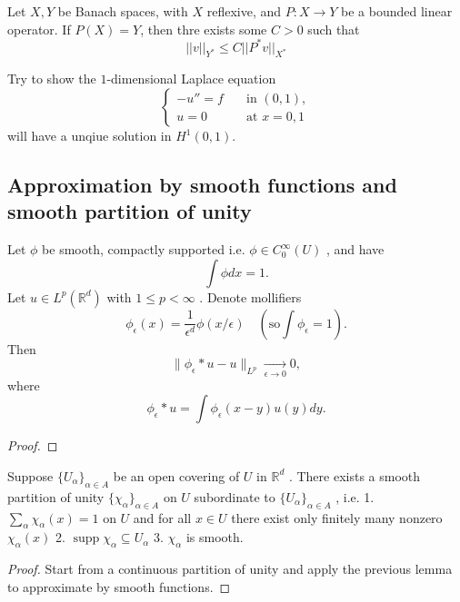 \begin{proposition}
    Let $X,Y$ be Banach spaces, with $X$ reflexive, and $P:X\to Y$ be a bounded linear operator. If $P(X) = Y$, then thre exists some $C>0$ such that
    \[||v||_{Y^*} \leq C||P^*v||_{X^*}\]
\end{proposition}

\begin{example}
    Try to show the $1$-dimensional Laplace equation
    \[
    \begin{cases}
        -u'' = f\quad &\text{in }(0,1), \\
        u=0&\text{at }x=0,1
    \end{cases}
    \]
    will have a unqiue solution in $H^1(0,1)$.
\end{example}



\subsection{Approximation by smooth functions and smooth partition of unity}
\begin{lemma}
Let \(\phi\) be smooth, compactly supported i.e. \(\phi \in C_{0}^{\infty}(U)\) , and have
\[
\int \phi dx = 1.
\]
Let \(u\in L^{p}(\mathbb{R}^{d})\) with \(1\leq p< \infty\) . Denote mollifiers
\[
\phi_{\epsilon}(x) = \frac{1}{\epsilon^{d}}\phi (x / \epsilon)\quad (\mathrm{so}\int \phi_{\epsilon} = 1).
\]
Then
\[
\| \phi_{\epsilon}*u - u\|_{L^{p}}\xrightarrow[\epsilon\to0]{}0,
\]
where
\[
\phi_{\epsilon}*u = \int \phi_{\epsilon}(x - y)u(y)dy.
\]
\end{lemma}

\begin{proof}

\end{proof}

\begin{lemma}
Suppose \(\{U_{\alpha}\}_{\alpha \in A}\) be an open covering of \(U\) in \(\mathbb{R}^{d}\) . There exists a smooth partition of unity \(\{\chi_{\alpha}\}_{\alpha \in A}\) on \(U\) subordinate to \(\{U_{\alpha}\}_{\alpha \in A}\) , i.e.
1. \(\sum_{\alpha}\chi_{\alpha}(x) = 1\) on \(U\) and for all \(x\in U\) there exist only finitely many nonzero \(\chi_{\alpha}(x)\)
2. \(\operatorname {supp}\chi_{\alpha}\subseteq U_{\alpha}\)
3. \(\chi_{\alpha}\) is smooth.
\end{lemma}

\begin{proof}
Start from a continuous partition of unity and apply the previous lemma to approximate by smooth functions.
\end{proof}

